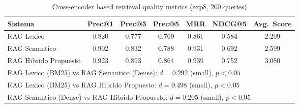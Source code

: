 \begin{table}[htbp]
\centering
\caption{Cross-encoder based retrieval quality metrics (exp8, 200 queries)}
\label{tab:retrieval-metrics}
\begin{tabular}{lcccccc}
\toprule
Sistema & Prec@1 & Prec@3 & Prec@5 & MRR & NDCG@5 & Avg.~Score \\
\midrule
RAG Lexico & 0.820 & 0.777 & 0.769 & 0.861 & 0.584 & 2.209 \\
RAG Semantico & 0.902 & 0.832 & 0.788 & 0.931 & 0.692 & 2.599 \\
RAG Hibrido Propuesto & 0.923 & 0.893 & 0.864 & 0.939 & 0.752 & 3.080 \\
\midrule
\multicolumn{7}{l}{\footnotesize RAG Lexico (BM25) vs RAG Semantico (Dense): $d=0.292$ (small), $p<0.05$} \\
\multicolumn{7}{l}{\footnotesize RAG Lexico (BM25) vs RAG Hibrido Propuesto: $d=0.498$ (small), $p<0.05$} \\
\multicolumn{7}{l}{\footnotesize RAG Semantico (Dense) vs RAG Hibrido Propuesto: $d=0.205$ (small), $p<0.05$} \\
\bottomrule
\end{tabular}
\end{table}